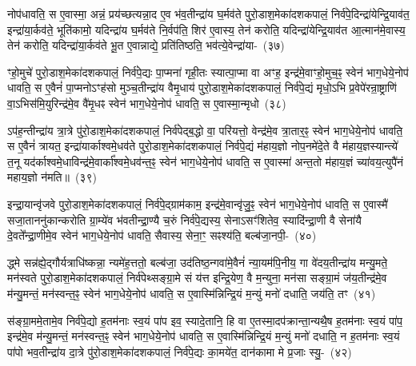 नोप॑धावति॒ स ए॒वास्मा॒ अन्नं॒ प्रय॑च्छत्यन्ना॒द ए॒व भ॑व॒तीन्द्रा॑य घ॒र्मव॑ते पुरो॒डाश॒मेका॑\-दश\-कपालं॒ निर्व॑पे॒दिन्द्रा॑येन्द्रि॒याव॑त॒ इन्द्रा॑\-या॒र्कव॑ते॒ भूति॑कामो॒ यदिन्द्रा॑य घ॒र्मव॑ते नि॒र्वप॑ति॒ शिर॑ ए॒वास्य॒ तेन॑ करोति॒ यदिन्द्रा॑येन्द्रि॒याव॑त आ॒त्मान॑मे॒वास्य॒ तेन॑ करोति॒ यदिन्द्रा॑या॒र्कव॑ते भू॒त ए॒वान्नाद्ये॒ प्रति॑तिष्ठति॒ भव॑त्ये॒वेन्द्रा॑या-~(३७)

ꣳहो॒मुचे॑ पुरो॒डाश॒मेका॑\-दश\-कपालं॒ निर्व॑पे॒द्यः पा॒प्मना॑ गृही॒तः स्यात्पा॒प्मा वा अꣳह॒ इन्द्र॑मे॒वाꣳहो॒मुच॒ꣴ॒ स्वेन॑ भाग॒धेये॒नोप॑ धावति॒ स ए॒वैनं॑ पा॒प्मनो\-ऽꣳह॑सो मुञ्च॒तीन्द्रा॑य वैमृ॒धाय॑ पुरो॒डाश॒मेका॑\-दश\-कपालं॒ निर्व॑पे॒द्यं मृधो॒\-ऽभि प्र॒वेपे॑रन्रा॒ष्ट्राणि॑ वा॒\-ऽभिस॑मि॒युरिन्द्र॑मे॒व वै॑मृ॒धꣴ स्वेन॑ भाग॒धेये॒नोप॑ धावति॒ स ए॒वास्मा॒न्मृधो~(३८)

ऽप॑ह॒न्तीन्द्रा॑य त्रा॒त्रे पु॑रो॒डाश॒मेका॑\-दश\-कपालं॒ निर्व॑पेद्ब॒द्धो वा॒ परि॑यत्तो॒ वेन्द्र॑मे॒व त्रा॒तार॒ꣴ॒ स्वेन॑ भाग॒धेये॒नोप॑ धावति॒ स ए॒वैनं॑ त्रायत॒ इन्द्रा॑यार्काश्वमे॒धव॑ते पुरो॒डाश॒मेका॑\-दश\-कपालं॒ निर्व॑पे॒द्यं म॑हाय॒ज्ञो नोप॒नमे॑दे॒ते वै म॑हाय॒ज्ञस्यान्त्ये॑ त॒नू यद॑र्काश्वमे॒धाविन्द्र॑मे॒वार्का᳚श्वमे॒धव॑न्त॒ꣴ॒ स्वेन॑ भाग॒धेये॒नोप॑ धावति॒ स ए॒वास्मा॑ अन्त॒तो म॑हाय॒ज्ञं च्या॑वय॒त्युपै॑नं महाय॒ज्ञो न॑मति॥~(३९)

{\anuvakamend[{इ॒न्द्रि॒याव॑न्त॒ꣴ॒ स्वेन॑ भाग॒धेये॒नोप॑ धावति॒ सो᳚\-ऽर्कव॑न्त॒ꣴ॒ स्वेन॑ भाग॒धेये॑नै॒वेन्द्रा॑यास्मा॒न्मृधो᳚\-ऽस्मै स॒प्त च॑}]}

इन्द्रा॒यान्वृ॑जवे पुरो॒डाश॒मेका॑\-दश\-कपालं॒ निर्व॑पे॒द्ग्राम॑काम॒ इन्द्र॑मे॒वान्वृ॑जु॒ꣴ॒ स्वेन॑ भाग॒धेये॒नोप॑ धावति॒ स ए॒वास्मै॑ सजा॒ताननु॑कान्करोति ग्रा॒म्ये॑व भ॑वतीन्द्रा॒ण्यै च॒रुं निर्व॑पे॒द्यस्य॒ सेना\-ऽसꣳ॑शितेव॒ स्यादि॑न्द्रा॒णी वै सेना॑यै दे॒वते᳚न्द्रा॒णीमे॒व स्वेन॑ भाग॒धेये॒नोप॑ धावति॒ सैवास्य॒ सेना॒ꣳ॒ सꣴश्य॑ति॒ बल्ब॑जा॒नपी॒-~(४०)

द्ध्मे सन्न॑ह्ये॒द्गौर्यत्राधि॑ष्कन्ना॒ न्यमे॑ह॒त्ततो॒ बल्ब॑जा॒ उद॑तिष्ठ॒न्गवा॑\-मे॒वैनं॑ न्या॒यम॑पि॒नीय॒ गा वे॑दय॒तीन्द्रा॑य मन्यु॒मते॒ मन॑स्वते पुरो॒डाश॒मेका॑\-दश\-कपालं॒ निर्व॑पेथ्सङ्ग्रा॒मे सं य॑त्त इन्द्रि॒येण॒ वै म॒न्युना॒ मन॑सा सङ्ग्रा॒मं ज॑य॒तीन्द्र॑मे॒व म॑न्यु॒मन्तं॒ मन॑स्वन्त॒ꣴ॒ स्वेन॑ भाग॒धेये॒नोप॑ धावति॒ स ए॒वास्मि॑न्निन्द्रि॒यं म॒न्युं मनो॑ दधाति॒ जय॑ति॒ तꣳ~(४१)

स॑ङ्ग्रा॒ममे॒तामे॒व निर्व॑पे॒द्यो ह॒तम॑नाः स्व॒यं पा॑प इव॒ स्यादे॒तानि॒ हि वा ए॒तस्मा॒दप॑क्रान्ता॒न्यथै॒ष ह॒तम॑नाः स्व॒यं पा॑प॒ इन्द्र॑मे॒व म॑न्यु॒मन्तं॒ मन॑स्वन्त॒ꣴ॒ स्वेन॑ भाग॒धेये॒नोप॑ धावति॒ स ए॒वास्मि॑न्निन्द्रि॒यं म॒न्युं मनो॑ दधाति॒ न ह॒तम॑नाः स्व॒यं पा॑पो भव॒तीन्द्रा॑य दा॒त्रे पु॑रो॒डाश॒मेका॑\-दश\-कपालं॒ निर्व॑पे॒द्यः का॒मये॑त॒ दान॑कामा मे प्र॒जाः स्यु॒-~(४२)

